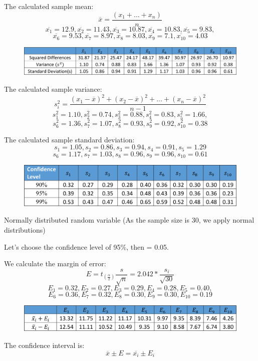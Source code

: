 \documentclass[a4paper,12pt]{article}
\begin{document}
\begin{appendices}
The calculated sample mean:
$$\overline{x}=\frac{(x_1+...+x_n)}{n}$$
$$\overline{x_1}=12.9,\overline{x_2}=11.43,\overline{x_3}=10.87,\overline{x_4}=10.83,\overline{x_5}=9.83,$$
$$\overline{x_6}=9.53,\overline{x_7}=8.97,\overline{x_8}=8.03,\overline{x_9}=7.1,\overline{x_{10}}=4.03$$

\begin{figure}[h!]
\centering
\includegraphics[scale=.75]{StatisticalTest/Quality2.png}
\end{figure}

The calculated sample variance:
$$s_i^2=\frac{(x_1-\overline{x})^2+(x_2-\overline{x})^2+...+(x_n-\overline{x})^2}{n-1}$$
$$s_1^2=1.10,s_2^2=0.74,s_3^2=0.88,s_4^2=0.83,s_5^2=1.66, $$
$$s_6^2=1.36,s_7^2=1.07,s_8^2=0.93,s_9^2=0.92,s_10^2= 0.38$$

The calculated sample standard deviation:
$$s_1=1.05,s_2=0.86,s_3=0.94,s_4=0.91,s_5=1.29$$
$$s_6=1.17,s_7=1.03,s_8=0.96,s_9=0.96,s_10=0.61$$

\begin{figure}[h!]
\centering
\includegraphics[scale=.9]{StatisticalTest/Quality3.png}
\end{figure}

Normally distributed random variable (As the sample size is 30, we apply normal distributions)

Let’s choose the confidence level of 95\%, then  = 0.05.

We calculate the margin of error:
$$E=t_{(\frac{\alpha}{2})}  \frac{s}{\sqrt{n}}=2.042*\frac{s_i}{\sqrt{30}}$$
$$E_1= 0.32,E_2=0.27,E_3=0.29,E_4=0.28,E_5=0.40,$$
$$E_6=0.36,E_7=0.32,E_8=0.30,E_9=0.30,E_10=0.19$$


\begin{figure}[h!]
\centering
\includegraphics[scale=.9]{StatisticalTest/Quality4.png}
\end{figure}
The confidence interval is:
$$\overline{x}\pm{E}=\overline{x_i}\pm{E}_i$$


\end{appendices}
\end{document}
